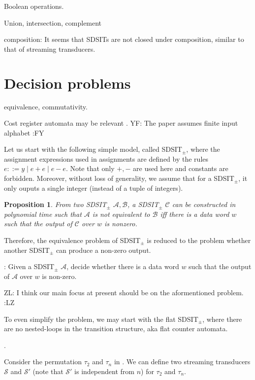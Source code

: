 \documentclass[11pt]{article}
\newtheorem{proposition}[theorem]{Proposition}
\def\Aa{{\mathscr{A} }}
\def\Bb{{\mathscr{B} }}
\def\Cc{{\mathscr{C} }}
\def\Ss{{\mathcal{S} }}
\newcommand{\yfc}[1]{\color{blue} {YF: #1 :FY} \color{black}}
\newcommand{\zhilin}[1]{\color{cyan} {ZL: #1 :LZ} \color{black}}
\begin{document}
Boolean operations.

Union, intersection, complement

composition: It seems that SDSITs are not closed under composition, similar to that of streaming transducers.

\section{Decision problems}

equivalence, commutativity.

Cost register automata may be relevant \cite{ADD+13}. 
\yfc{The paper assumes finite input alphabet}

Let us start with the following simple model, called SDSIT$_{\pm}$, where the assignment expressions used in assignments are defined by the rules $e::= y \mid e+e \mid e - e$. Note that only $+,-$ are used here and constants are forbidden. Moreover, without loss of generality, we assume that for a SDSIT$_{\pm}$, it only ouputs a single integer (instead of a tuple of integers).

\begin{proposition}
From two SDSIT$_{\pm}$ $\Aa,\Bb$, a SDSIT$_{\pm}$ $\Cc$ can be constructed in polynomial time such that $\Aa$ is not equivalent to $\Bb$ iff there is a data word $w$ such that the output of $\Cc$ over $w$ is nonzero. 
\end{proposition}

Therefore, the equivalence problem of SDSIT$_{\pm}$ is reduced to the problem whether another SDSIT$_{\pm}$ can produce a non-zero output.

\medskip

: Given a SDSIT$_{\pm}$ $\Aa$, decide whether there is a data word $w$ such that the output of $\Aa$ over $w$ is non-zero. 

\medskip

\zhilin{I think our main focus at present should be on the aformentioned problem.}

To even simplify the problem, we may start with the flat SDSIT$_{\pm}$, where there are no nested-loops in the transition structure, aka flat counter automata.

.

Consider the permutation $\tau_2$ and $\tau_n$ in \cite{CHSW15}. We can define two streaming transducers $\Ss$ and $\Ss'$ (note that $\Ss'$ is independent from $n$)  for $\tau_2$ and $\tau_n$.
\end{document}
